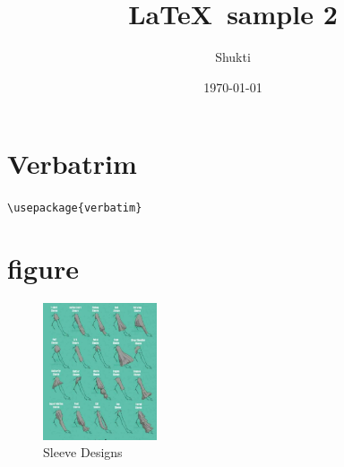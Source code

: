 \documentclass[letter, 12pt]{article}
\author{Shukti}
\date{\today}
\title{\LaTeX \ sample 2}
\begin{document}
	\maketitle 
	\tableofcontents
\section{Verbatrim}
	\verb|\usepackage{verbatim}|
\section{figure}
\begin{figure}[h]
	\centering
	\includegraphics[width=0.3\textwidth]{star.jpg}
	\caption{Sleeve Designs}
	\label{fig:Sleeve}
\end{figure}
\end{document}
